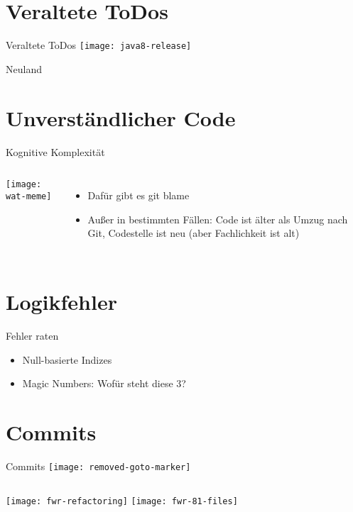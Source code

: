 \documentclass{beamer}
\begin{document}
\section{Veraltete ToDos}
\begin{frame}{Veraltete ToDos}
    \fixme\pause
    \vfill
    \texttt{[image: java8-release]}
\end{frame}

\begin{frame}{Neuland}
    \cd
\end{frame}

\section{Unverständlicher Code}

\begin{frame}{Kognitive Komplexität}
  \lastPart
  \pause
  \begin{columns}[c]
    \column{1.5in}
    \texttt{[image: wat-meme]}\pause
    \column{1.5in}
    \begin{itemize}
      \item Dafür gibt es git blame \pause
      \item Außer in bestimmten Fällen: Code ist älter als Umzug nach Git, Codestelle ist neu (aber Fachlichkeit ist alt)
    \end{itemize}
  \end{columns}

\end{frame}

\section{Logikfehler}

\begin{frame}{Fehler raten}
  \offByOne
  \begin{itemize}
    \item<2-> Null-basierte Indizes
    \vfill
    \item<3-> Magic Numbers: Wofür steht diese 3?
  \end{itemize}
\end{frame}

\section{Commits}

\begin{frame}{Commits}
  \texttt{[image: removed-goto-marker]}\pause
  \vfill
  \begin{columns}[c]
    \column{1.5in}
    \texttt{[image: fwr-refactoring]}
    \column{1.5in}
    \texttt{[image: fwr-81-files]}
  \end{columns}
\end{frame}
\end{document}
